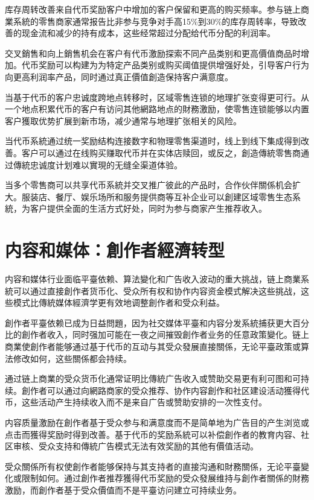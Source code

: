 \documentclass[
  Letterpaper,
]{scrbook}
\begin{document}
库存周转改善来自代币奖励客户中增加的客户保留和更高的购买频率。参与链上商業系統的零售商家通常报告比非参与竞争对手高15\%到30\%的库存周转率，导致改善的现金流和减少的持有成本，这些经常超过分配给代币分配的利润率。

交叉銷售和向上銷售机会在客户有代币激励探索不同产品类别和更高價值商品时增加。代币奖励可以构建为为特定产品类别或购买阈值提供增强好处，引导客户行为向更高利润率产品，同时通过真正價值創造保持客户满意度。

当基于代币的客户忠诚度跨地点转移时，区域零售连锁的地理扩张变得更可行。从一个地点积累代币的客户有访问其他網路地点的財務激励，使零售连锁能够以内置客户獲取优势扩展到新市场，减少通常与地理扩张相关的风险。

当代币系統通过统一奖励结构连接数字和物理零售渠道时，线上到线下集成得到改善。客户可以通过在线购买赚取代币并在实体店赎回，或反之，創造傳統零售商通过傳統忠诚度计划难以實現的无缝全渠道体验。

当多个零售商可以共享代币系統并交叉推广彼此的产品时，合作伙伴關係机会扩大。服装店、餐厅、娱乐场所和服务提供商等互补企业可以創建区域零售生态系統，为客户提供全面的生活方式好处，同时为参与商家产生推荐收入。

\section{内容和媒体：創作者經濟转型}\label{ux5185ux5bb9ux548cux5a92ux4f53ux5275ux4f5cux8005ux7d93ux6fdfux8f6cux578b}

内容和媒体行业面临平臺依赖、算法變化和广告收入波动的重大挑战，链上商業系統可以通过直接創作者货币化、受众所有权和协作内容资金模式解决这些挑战，这些模式比傳統媒体經濟学更有效地调整創作者和受众利益。

創作者平臺依赖已成为日益問題，因为社交媒体平臺和内容分发系統捕获更大百分比的創作者收入，同时强加可能在一夜之间摧毁創作者业务的任意政策變化。链上商業使創作者能够通过基于代币的互动与其受众發展直接關係，无论平臺政策或算法修改如何，这些關係都会持续。

通过链上商業的受众货币化通常证明比傳統广告收入或赞助交易更有利可图和可持续。創作者可以通过向網路商家的受众推荐、协作内容創作和社区建设活动獲得代币，这些活动产生持续收入而不是来自广告或赞助安排的一次性支付。

内容质量激励在創作者基于受众参与和满意度而不是简单地为广告目的产生浏览或点击而獲得奖励时得到改善。基于代币的奖励系統可以补偿創作者的教育内容、社区审核、受众支持和傳統广告模式无法有效奖励的其他有價值活动。

受众關係所有权使創作者能够保持与其支持者的直接沟通和財務關係，无论平臺變化或限制如何。通过創作者推荐獲得代币奖励的受众發展维持与創作者關係的財務激励，而創作者基于受众價值而不是平臺访问建立可持续业务。
\end{document}
